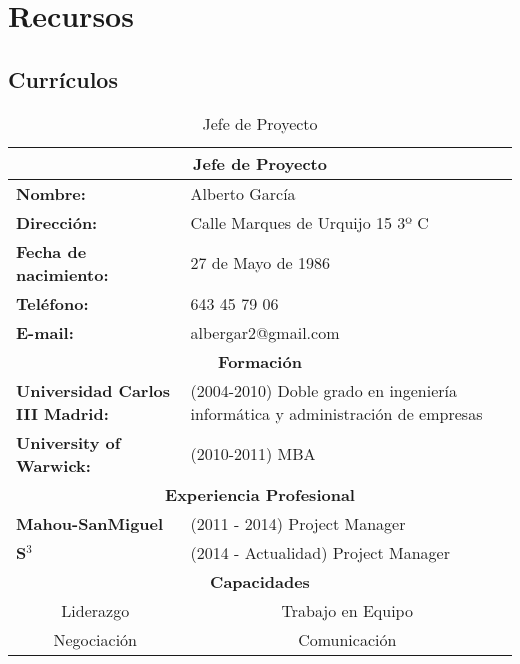 \section{Recursos}
\subsection{Currículos}

\begin{table}[H]
\begin{center}
\begin{tabular}{p{} p{9cm}}
\multicolumn{2}{c}{\Large{\textbf{Jefe de Proyecto}}} \\
\hline
\textbf{Nombre:} & Alberto García\\
\textbf{Dirección:} & Calle Marques de Urquijo 15 3º C\\
\textbf{Fecha de nacimiento:} & 27 de Mayo de 1986 \\
\textbf{Teléfono:} & 643 45 79 06\\
\textbf{E-mail:} & albergar2@gmail.com\\
\hline \hline
\multicolumn{2}{c}{\textbf{Formación} } \\
\hline
\textbf{Universidad Carlos III Madrid:} & (2004-2010) Doble grado en ingeniería informática y administración de empresas  \\
\textbf{University of Warwick:} & (2010-2011) MBA  \\
\hline \hline
\multicolumn{2}{c}{\textbf{Experiencia Profesional} } \\
\hline
\textbf{Mahou-SanMiguel} & (2011 - 2014) Project Manager\\
\textbf{S$^3$} & (2014 - Actualidad) Project Manager\\
\hline \hline
\multicolumn{2}{c}{\textbf{Capacidades} } \\
\hline
\multicolumn{1}{c}{Liderazgo} & \multicolumn{1}{c}{Trabajo en Equipo}\\
\multicolumn{1}{c}{Negociación} & \multicolumn{1}{c}{Comunicación} \\
\hline \hline
\end{tabular}
\caption{Jefe de Proyecto}
\label{tab:jefeDeProyecto}
\end{center}
\end{table}



